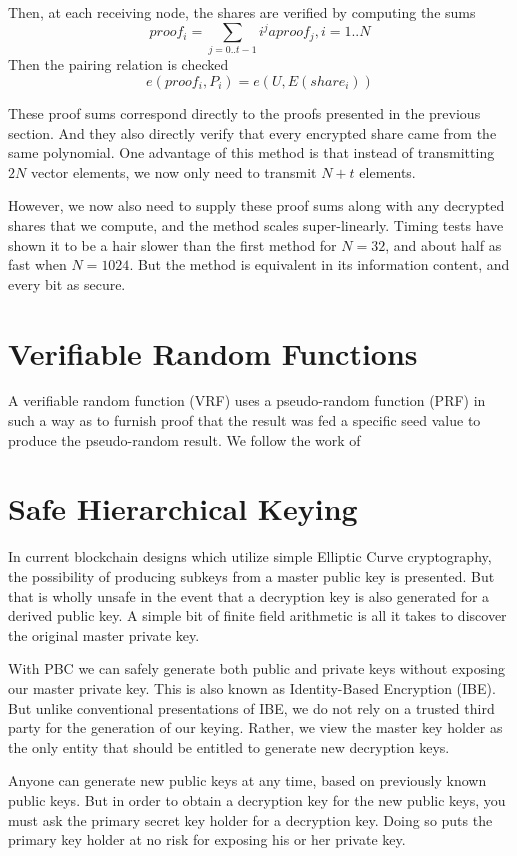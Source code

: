 \documentclass[article,oneside]{memoir}
\begin{document}
Then, at each receiving node, the shares are verified by computing the sums
$$ proof_i = \sum_{j=0..t-1} i^j aproof_j, i = 1..N$$
Then the pairing relation is checked
$$e(proof_i, P_i) = e(U,E(share_i))$$

These proof sums correspond directly to the proofs presented in the previous section. And they also directly verify that every encrypted share came from the same polynomial. One advantage of this method is that instead of transmitting $2 N$ vector elements, we now only need to transmit $N+t$ elements.

However, we now also need to supply these proof sums along with any decrypted shares that we compute, and the method scales super-linearly. Timing tests have shown it to be a hair slower than the first method for $N=32$, and about half as fast when $N=1024$. But the method is equivalent in its information content, and every bit as secure.

\chapter{Verifiable Random Functions}
A verifiable random function (VRF) uses a pseudo-random function (PRF) in such a way as to furnish proof that the result was fed a specific seed value to produce the pseudo-random result. We follow the work of\cite{vrf}


\chapter{Safe Hierarchical Keying}

In current blockchain designs which utilize simple Elliptic Curve cryptography, the possibility of producing subkeys from a master public key is presented. But that is wholly unsafe in the event that a decryption key is also generated for a derived public key. A simple bit of finite field arithmetic is all it takes to discover the original master private key.

With PBC we can safely generate both public and private keys without exposing our master private key. This is also known as Identity-Based Encryption (IBE). But unlike conventional presentations of IBE, we do not rely on a trusted third party for the generation of our keying. Rather, we view the master key holder as the only entity that should be entitled to generate new decryption keys. 

Anyone can generate new public keys at any time, based on previously known public keys.
But in order to obtain a decryption key for the new public keys, you must ask the primary secret key holder for a decryption key. Doing so puts the primary key holder at no risk for exposing his or her private key.
\end{document}
